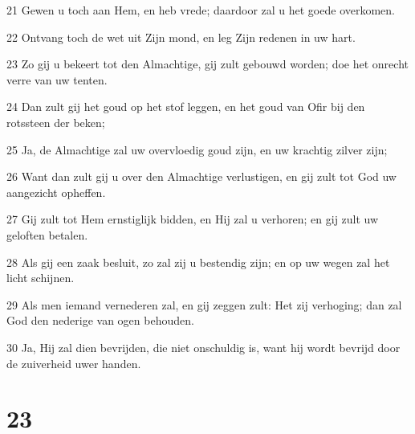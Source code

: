 \par 21 Gewen u toch aan Hem, en heb vrede; daardoor zal u het goede overkomen.
\par 22 Ontvang toch de wet uit Zijn mond, en leg Zijn redenen in uw hart.
\par 23 Zo gij u bekeert tot den Almachtige, gij zult gebouwd worden; doe het onrecht verre van uw tenten.
\par 24 Dan zult gij het goud op het stof leggen, en het goud van Ofir bij den rotssteen der beken;
\par 25 Ja, de Almachtige zal uw overvloedig goud zijn, en uw krachtig zilver zijn;
\par 26 Want dan zult gij u over den Almachtige verlustigen, en gij zult tot God uw aangezicht opheffen.
\par 27 Gij zult tot Hem ernstiglijk bidden, en Hij zal u verhoren; en gij zult uw geloften betalen.
\par 28 Als gij een zaak besluit, zo zal zij u bestendig zijn; en op uw wegen zal het licht schijnen.
\par 29 Als men iemand vernederen zal, en gij zeggen zult: Het zij verhoging; dan zal God den nederige van ogen behouden.
\par 30 Ja, Hij zal dien bevrijden, die niet onschuldig is, want hij wordt bevrijd door de zuiverheid uwer handen.

\chapter{23}

